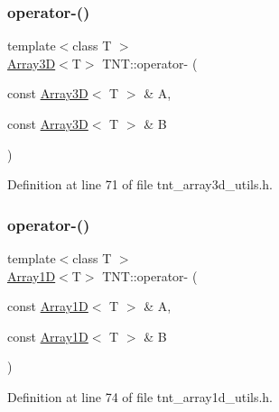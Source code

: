\subsubsection{\texorpdfstring{operator-\/()}{operator-()}\hspace{0.1cm}{\footnotesize\ttfamily [1/7]}}
{\footnotesize\ttfamily template$<$class T $>$ \\
\hyperlink{classTNT_1_1Array3D}{Array3D}$<$T$>$ T\+N\+T\+::operator-\/ (\begin{DoxyParamCaption}\item[{const \hyperlink{classTNT_1_1Array3D}{Array3D}$<$ T $>$ \&}]{A,  }\item[{const \hyperlink{classTNT_1_1Array3D}{Array3D}$<$ T $>$ \&}]{B }\end{DoxyParamCaption})}



Definition at line 71 of file tnt\+\_\+array3d\+\_\+utils.\+h.

\mbox{\label{namespaceTNT_a79ec326e12f3292bf034035d52c98a08}} 
\subsubsection{\texorpdfstring{operator-\/()}{operator-()}\hspace{0.1cm}{\footnotesize\ttfamily [2/7]}}
{\footnotesize\ttfamily template$<$class T $>$ \\
\hyperlink{classTNT_1_1Array1D}{Array1D}$<$T$>$ T\+N\+T\+::operator-\/ (\begin{DoxyParamCaption}\item[{const \hyperlink{classTNT_1_1Array1D}{Array1D}$<$ T $>$ \&}]{A,  }\item[{const \hyperlink{classTNT_1_1Array1D}{Array1D}$<$ T $>$ \&}]{B }\end{DoxyParamCaption})}



Definition at line 74 of file tnt\+\_\+array1d\+\_\+utils.\+h.

\mbox{\label{namespaceTNT_a556e2242e5f6a09cc7240a3d544a0149}} 
